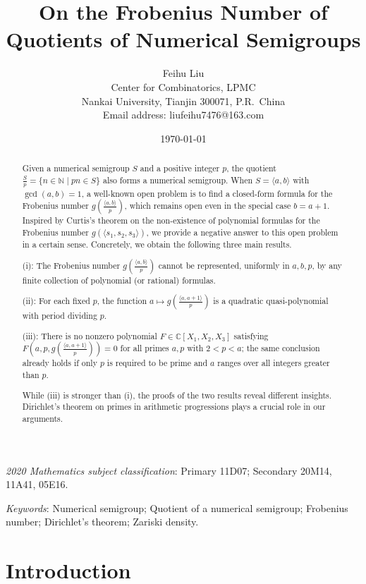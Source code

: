 \documentclass[reqno, 12pt]{article}
\title{On the Frobenius Number of Quotients of Numerical Semigroups}
\author{Feihu Liu
\\[2mm]
{\small Center for Combinatorics, LPMC}\\[-0.8ex]
{\small Nankai University, Tianjin 300071, P.R.~China}\\
{\small Email address: liufeihu7476@163.com}\\
}
\date{\today}
\numberwithin{equation}{section}
\theoremstyle{definition}
\begin{document}
\maketitle

\begin{abstract}
Given a numerical semigroup $S$ and a positive integer $p$, the quotient $\frac{S}{p}=\{n\in \mathbb{N} \mid pn\in S\}$ also forms a numerical semigroup. When $S=\langle a,b\rangle$ with $\gcd(a,b)=1$, a well-known open problem is to find a closed-form formula for the Frobenius number $g\!\left(\frac{\langle a,b\rangle}{p}\right)$, which remains open even in the special case $b=a+1$. Inspired by Curtis's theorem on the non-existence of polynomial formulas for the Frobenius number $g(\langle s_1,s_2,s_3\rangle)$, we provide a negative answer to this open problem in a certain sense. Concretely, we obtain the following three main results.

(i): The Frobenius number $g\!\left(\frac{\langle a,b\rangle}{p}\right)$ cannot be represented, uniformly in $a,b,p$, by any finite collection of polynomial (or rational) formulas.

(ii): For each fixed $p$, the function $a\mapsto g\!\left(\frac{\langle a,a+1\rangle}{p}\right)$ is a quadratic quasi-polynomial with period dividing $p$.

(iii): There is no nonzero polynomial $F\in \mathbb{C}[X_1,X_2,X_3]$ satisfying $F\left(a,p,g\!\left(\frac{\langle a,a+1\rangle}{p}\right)\right)=0$ for all primes $a,p$ with $2<p<a$; the same conclusion already holds if only $p$ is required to be prime and $a$ ranges over all integers greater than $p$.

While (iii) is stronger than (i), the proofs of the two results reveal different insights. Dirichlet's theorem on primes in arithmetic progressions plays a crucial role in our arguments.
\end{abstract}

\noindent
\begin{small}
\emph{2020 Mathematics subject classification}: Primary 11D07;  Secondary 20M14, 11A41, 05E16.
\end{small}

\noindent
\begin{small}
\emph{Keywords}: Numerical semigroup; Quotient of a numerical semigroup; Frobenius number; Dirichlet's theorem; Zariski density.
\end{small}

\tableofcontents

\section{Introduction}
\end{document}
